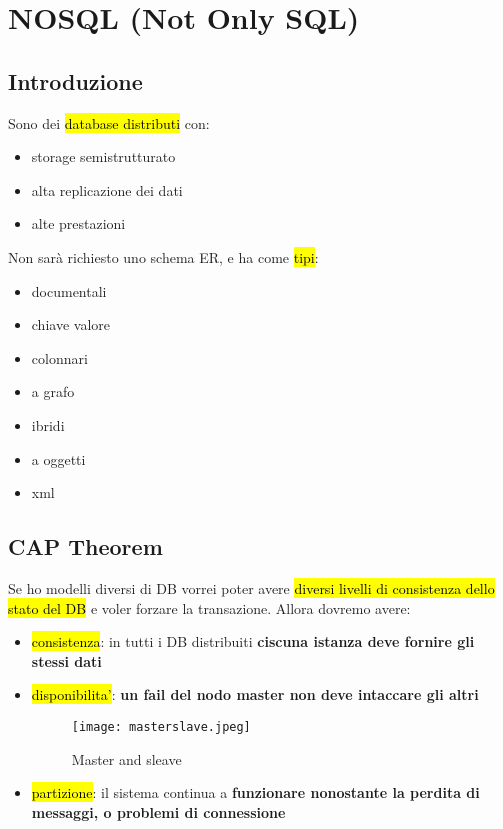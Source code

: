 \newpage
\section{NOSQL (Not Only SQL)}


\subsection{Introduzione}

Sono dei \hl{database distributi} con:

\begin{itemize}
    \item storage semistrutturato
    \item alta replicazione dei dati
    \item alte prestazioni
\end{itemize}

Non sarà richiesto uno schema ER, e ha come \hl{tipi}:

\begin{itemize}
    \item documentali
    \item chiave valore
    \item colonnari
    \item a grafo
    \item ibridi
    \item a oggetti
    \item xml
\end{itemize}


\subsection{CAP Theorem}

Se ho modelli diversi di DB vorrei poter avere \hl{diversi livelli di consistenza dello stato del DB} e voler forzare la transazione. Allora dovremo avere:

\begin{itemize}
    \item \hl{consistenza}: in tutti i DB distribuiti \textbf{ciscuna istanza deve fornire gli stessi dati}
    \item \hl{disponibilita'}: \textbf{un fail del nodo master non deve intaccare gli altri}
    

    \begin{figure}[H]
    \centering
    \texttt{[image: masterslave.jpeg]}
    \caption{Master and sleave} 
    \label{masterslave}
    \end{figure}


    \item \hl{partizione}: il sistema continua a \textbf{funzionare nonostante la perdita di messaggi, o problemi di connessione}
\end{itemize}

